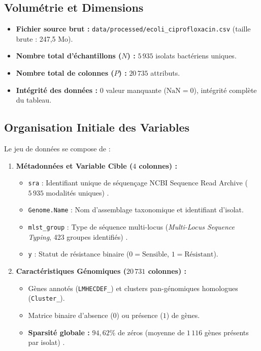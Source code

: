 \documentclass[11pt,a4paper]{article}
\begin{document}
\subsection{Volumétrie et Dimensions}

\begin{itemize}[leftmargin=*, label=$\bullet$]
    \item \textbf{Fichier source brut :} \texttt{data/processed/ecoli\_ciprofloxacin.csv} (taille brute : 247,5 Mo).
    \item \textbf{Nombre total d'échantillons ($N$) :} $5\,935$ isolats bactériens uniques.
    \item \textbf{Nombre total de colonnes ($P$) :} $20\,735$ attributs.
    \item \textbf{Intégrité des données :} $0$ valeur manquante ($\text{NaN} = 0$), intégrité complète du tableau.
\end{itemize}

\subsection{Organisation Initiale des Variables}

Le jeu de données se compose de :
\begin{enumerate}
    \item \textbf{Métadonnées et Variable Cible ($4$ colonnes) :}
    \begin{itemize}
        \item \texttt{sra} : Identifiant unique de séquençage NCBI Sequence Read Archive ($5\,935$ modalités uniques) \citep{leinonen2011sequence}.
        \item \texttt{Genome.Name} : Nom d'assemblage taxonomique et identifiant d'isolat.
        \item \texttt{mlst\_group} : Type de séquence multi-locus (\textit{Multi-Locus Sequence Typing}, 423 groupes identifiés) \citep{maiden1998multilocus}.
        \item \texttt{y} : Statut de résistance binaire ($0 = \text{Sensible}$, $1 = \text{Résistant}$).
    \end{itemize}

    \item \textbf{Caractéristiques Génomiques ($20\,731$ colonnes) :}
    \begin{itemize}
        \item Gènes annotés (\texttt{LMHECDEF\_}) et clusters pan-génomiques homologues (\texttt{Cluster\_}).
        \item Matrice binaire d'absence ($0$) ou présence ($1$) de gènes.
        \item \textbf{Sparsité globale :} $94,62\%$ de zéros (moyenne de $1\,116$ gènes présents par isolat) \citep{hastie2015statistical}.
    \end{itemize}
\end{enumerate}
\end{document}
